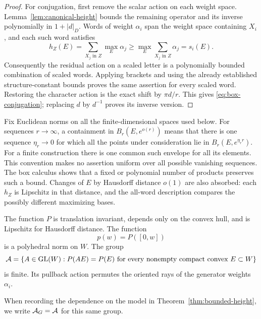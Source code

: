\begin{proof}
For conjugation, first remove the scalar action on each weight space.
Lemma~\ref{lem:canonical-height} bounds the remaining operator and its
inverse polynomially in $1+|d|_D$. Words of weight $\alpha_i$ span
the weight space containing $X_i$, and each such word satisfies
\begin{equation}\label{eq:weight-width-domination}
 h_Z(E)=\sum_{X_j\text{ in }Z}\max_E\alpha_j
 \ge\max_E\sum_{X_j\text{ in }Z}\alpha_j=s_i(E).
\end{equation}
Consequently the residual action on a scaled letter is a
polynomially bounded combination of scaled words. Applying brackets
and using the already established structure-constant bounds proves
the same assertion for every scaled word. Restoring the character
action is the exact shift by $\pi d/r$. This gives
\eqref{eq:box-conjugation}; replacing $d$ by $d^{-1}$ proves its
inverse version.
\end{proof}

Fix Euclidean norms on all the finite-dimensional spaces used below.
For sequences $r\to\infty$, a containment in $B_r(E,e^{o(r)})$
means that there is one sequence $\eta_r\to0$ for which all the
points under consideration lie in $B_r(E,e^{\eta_r r})$.
For a finite construction there is one common such envelope for all
its elements. This convention makes no assertion uniform over all
possible vanishing sequences. The box calculus shows that a fixed or
polynomial number of products preserves such a bound. Changes of
$E$ by Hausdorff distance $o(1)$ are also absorbed: each $h_Z$ is
Lipschitz in that distance, and the all-word description compares the
possibly different maximizing bases.

\begin{lemma}\label{lem:support-symmetries}
The function $P$ is translation invariant, depends only on the convex
hull, and is Lipschitz for Hausdorff distance. The function
\[
 p(w)=P([0,w])
\]
is a polyhedral norm on $W$. The group
\begin{equation}\label{eq:support-symmetry-group}
 \mathcal A=\{A\in\operatorname{GL}(W):P(AE)=P(E)\text{ for every nonempty
 compact convex }E\subset W\}
\end{equation}
is finite. Its pullback action permutes the oriented rays of the
generator weights $\alpha_i$.
\end{lemma}

When recording the dependence on the model in
Theorem~\ref{thm:bounded-height}, we write $\mathcal A_G=\mathcal A$ for
this same group.

